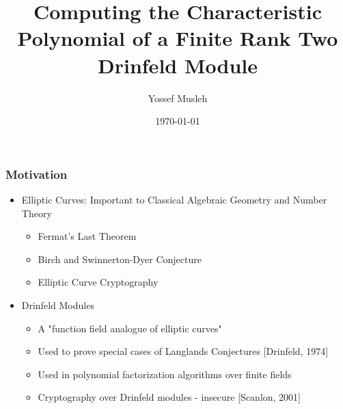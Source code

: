 \documentclass{beamer}
\title[master talk]{Computing the Characteristic Polynomial of a Finite Rank Two Drinfeld Module} %
\author{Yossef Musleh} %
\institute[UW] %
{
University of Waterloo \\ %
\medskip
\textit{ymusleh@uwaterloo.ca} %
}
\date{\today} %
\begin{document}
\begin{frame}
\titlepage %
\end{frame}



\begin{frame}
\frametitle{Motivation}

\begin{itemize}

\item  Elliptic Curves: Important to Classical Algebraic Geometry and Number Theory

\begin{itemize}
    \item Fermat's Last Theorem
    \item Birch and Swinnerton-Dyer Conjecture
    \item Elliptic Curve Cryptography
    
\end{itemize}

\item Drinfeld Modules
\begin{itemize}
\item A "function field analogue of elliptic curves"
    \item Used to prove special cases of Langlands Conjectures [Drinfeld, 1974]
    \item Used in polynomial factorization algorithms over finite fields
    
 
    \item Cryptography over Drinfeld modules - insecure [Scanlon, 2001]
\end{itemize}
  
  
  
  
\end{itemize}

\end{frame}
\end{document}
